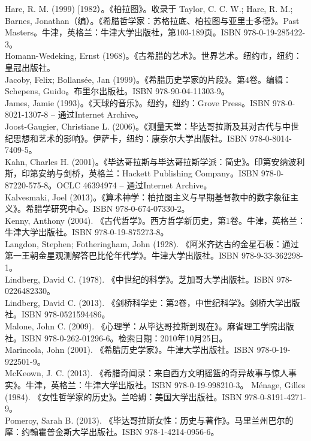 Hare, R. M. (1999) [1982）。《柏拉图》。收录于 Taylor, C. C. W.; Hare, R. M.; Barnes, Jonathan（编）。《希腊哲学家：苏格拉底、柏拉图与亚里士多德》。Past Masters。牛津，英格兰：牛津大学出版社，第103-189页。ISBN 978-0-19-285422-3。\\  
Homann-Wedeking, Ernst (1968)。《古希腊的艺术》。世界艺术。纽约市，纽约：皇冠出版社。\\  
Jacoby, Felix; Bollansée, Jan (1999)。《希腊历史学家的片段》。第4卷。编辑：Schepens, Guido。布里尔出版社。ISBN 978-90-04-11303-9。\\  
James, Jamie (1993)。《天球的音乐》。纽约，纽约：Grove Press。ISBN 978-0-8021-1307-8 – 通过Internet Archive。\\  
Joost-Gaugier, Christiane L. (2006)。《测量天堂：毕达哥拉斯及其对古代与中世纪思想和艺术的影响》。伊萨卡，纽约：康奈尔大学出版社。ISBN 978-0-8014-7409-5。\\  
Kahn, Charles H. (2001)。《毕达哥拉斯与毕达哥拉斯学派：简史》。印第安纳波利斯，印第安纳与剑桥，英格兰：Hackett Publishing Company。ISBN 978-0-87220-575-8。OCLC 46394974 – 通过Internet Archive。\\  
Kalvesmaki, Joel (2013)。《算术神学：柏拉图主义与早期基督教中的数字象征主义》。希腊学研究中心。ISBN 978-0-674-07330-2。\\
Kenny, Anthony (2004). 《古代哲学》。西方哲学新历史，第1卷。牛津，英格兰：牛津大学出版社。ISBN 978-0-19-875273-8。\\  
Langdon, Stephen; Fotheringham, John (1928). 《阿米齐达古的金星石板：通过第一王朝金星观测解答巴比伦年代学》。牛津大学出版社。ISBN 978-9-33-362298-1。\\  
Lindberg, David C. (1978). 《中世纪的科学》。芝加哥大学出版社。ISBN 978-0226482330。\\  
Lindberg, David C. (2013). 《剑桥科学史：第2卷，中世纪科学》。剑桥大学出版社。ISBN 978-0521594486。\\  
Malone, John C. (2009). 《心理学：从毕达哥拉斯到现在》。麻省理工学院出版社。ISBN 978-0-262-01296-6。检索日期：2010年10月25日。\\  
Marincola, John (2001). 《希腊历史学家》。牛津大学出版社。ISBN 978-0-19-922501-9。\\  
McKeown, J. C. (2013). 《希腊奇闻录：来自西方文明摇篮的奇异故事与惊人事实》。牛津，英格兰：牛津大学出版社。ISBN 978-0-19-998210-3。  
Ménage, Gilles (1984). 《女性哲学家的历史》。兰哈姆：美国大学出版社。ISBN 978-0-8191-4271-9。\\  
Pomeroy, Sarah B. (2013). 《毕达哥拉斯女性：历史与著作》。马里兰州巴尔的摩：约翰霍普金斯大学出版社。ISBN 978-1-4214-0956-6。\\
